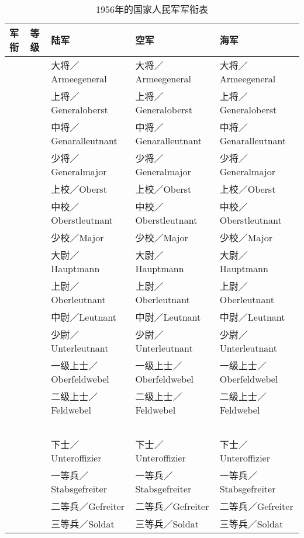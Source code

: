\begin{table}[!ht]
    \centering
    \caption{1956年的国家人民军军衔表}
    \begin{tabular}{lllll}
    \hline
        \textbf{军衔} & \textbf{等级} & \textbf{陆军} & \textbf{空军} & \textbf{海军} \\ \hline
        ~ & ~ & 大将／Armeegeneral & 大将／Armeegeneral & 大将／Armeegeneral \\ 
        ~ & ~ & 上将／Generaloberst & 上将／Generaloberst & 上将／Generaloberst \\ 
        ~ & ~ & 中将／Genaralleutnant & 中将／Genaralleutnant & 中将／Genaralleutnant \\ 
        ~ & ~ & 少将／Generalmajor & 少将／Generalmajor & 少将／Generalmajor \\ 
        ~ & ~ & 上校／Oberst & 上校／Oberst & 上校／Oberst \\ 
        ~ & ~ & 中校／Oberstleutnant & 中校／Oberstleutnant & 中校／Oberstleutnant \\ 
        ~ & ~ & 少校／Major & 少校／Major & 少校／Major \\ 
        ~ & ~ & 大尉／Hauptmann & 大尉／Hauptmann & 大尉／Hauptmann \\ 
        ~ & ~ & 上尉／Oberleutnant & 上尉／Oberleutnant & 上尉／Oberleutnant \\ 
        ~ & ~ & 中尉／Leutnant & 中尉／Leutnant & 中尉／Leutnant \\ 
        ~ & ~ & 少尉／Unterleutnant & 少尉／Unterleutnant & 少尉／Unterleutnant \\ 
        ~ & ~ & 一级上士／Oberfeldwebel & 一级上士／Oberfeldwebel & 一级上士／Oberfeldwebel \\ 
        ~ & ~ & 二级上士／Feldwebel & 二级上士／Feldwebel & 二级上士／Feldwebel \\ 
        ~ & ~ & ~ & ~ & ~ \\ 
        ~ & ~ & 下士／Unteroffizier & 下士／Unteroffizier & 下士／Unteroffizier \\ 
        ~ & ~ & 一等兵／Stabsgefreiter & 一等兵／Stabsgefreiter & 一等兵／Stabsgefreiter \\ 
        ~ & ~ & 二等兵／Gefreiter & 二等兵／Gefreiter & 二等兵／Gefreiter \\ 
        ~ & ~ & 三等兵／Soldat & 三等兵／Soldat & 三等兵／Soldat \\ \hline
    \end{tabular}
    \label{1956}
\end{table}